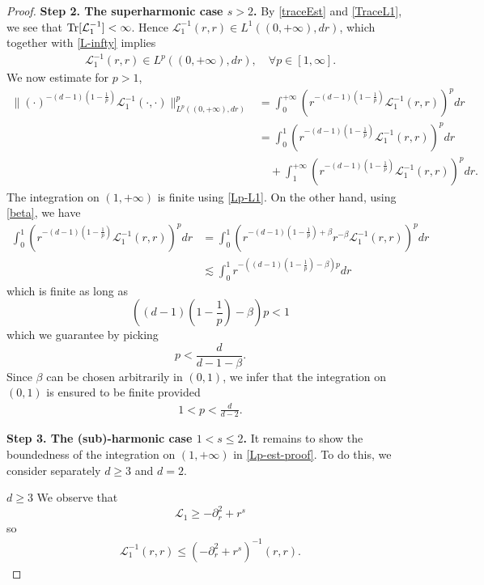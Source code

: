 \documentclass[%
11pt,  reqno]{amsart}
\theoremstyle{remarkstyle}
\newcommand{\1}{\hspace{0.2mm}\text{I}\hspace{0.2mm}}
\renewcommand{\L}{\mathcal{L}}
\numberwithin{equation}{section}
\numberwithin{theorem}{section}
\begin{document}
\begin{proof}
		{\bf Step 2. The superharmonic case $s>2$.} By \eqref{traceEst} and \eqref{TraceL1}, we see that ${\rm Tr}[\L_1^{-1}]<\infty$. Hence $\L_1^{-1}(r,r) \in L^1((0,+\infty),dr)$, which together with \eqref{L-infty} implies
		\begin{align} \label{Lp-L1}
			\L_1^{-1}(r,r) \in L^p((0,+\infty),dr), \quad \forall p \in [1,\infty].
		\end{align}
		We now estimate for $p>1$,
		\begin{align}
			\|(\cdot)^{-(d-1)\left(1-\frac{1}{p}\right)} \L_1^{-1}(\cdot,\cdot)\|^p_{L^p((0,+\infty),dr)} &= \int_0^{+\infty} \left(r^{-(d-1)\left(1-\frac{1}{p}\right)} \L_1^{-1}(r,r) \right)^p dr \nonumber\\
			&= \int_0^1 \left(r^{-(d-1)\left(1-\frac{1}{p}\right)} \L_1^{-1}(r,r) \right)^p dr \nonumber\\
			&\quad + \int_1^{+\infty} \left(r^{-(d-1)\left(1-\frac{1}{p}\right)} \L_1^{-1}(r,r) \right)^p dr. \label{Lp-est-proof}
		\end{align}
		The integration on $(1,+\infty)$ is finite using \eqref{Lp-L1}. On the other hand, using \eqref{beta}, we have
		\begin{align*}
			\int_0^1 \left(r^{-(d-1)\left(1-\frac{1}{p}\right)} \L_1^{-1}(r,r) \right)^p dr &=\int_0^1 \left(r^{-(d-1)\left(1-\frac{1}{p}\right)+\beta} r^{-\beta} \L_1^{-1}(r,r) \right)^p dr \\
			&\lesssim \int_0^1 r^{-\left((d-1)\left(1-\frac{1}{p}\right)-\beta\right)p} dr
		\end{align*}
		which is finite as long as
		\[
		\left((d-1)\left(1-\frac{1}{p}\right)-\beta\right)p <1
		\]
		which we guarantee by picking
		\[
		p<\frac{d}{d-1-\beta}.
		\]
		Since $\beta$ can be chosen arbitrarily in $(0,1)$, we infer that the integration on $(0,1)$ is ensured to be finite provided
		\begin{align}\label{Lp-est-01}
			1<p<\frac{d}{d-2}.
		\end{align}
		
		{\bf Step 3. The (sub)-harmonic case $1<s\leq 2$.} It remains to show the boundedness of the integration on $(1,+\infty)$ in \eqref{Lp-est-proof}. To do this, we consider separately $d\geq 3$ and $d=2$. 
		
		$\boxed{d\geq 3}$ We observe that
		$$
		\L_1 \geq -\partial^2_r + r^s
		$$
		so 
		\begin{align} \label{est-Green-d-geq3}
			\L_1^{-1}(r,r) \leq (-\partial^2_r +r^s)^{-1}(r,r).
		\end{align} 
		

\end{proof}
\end{document}
